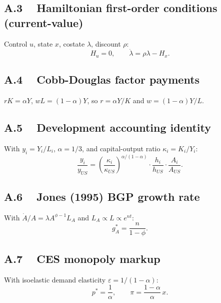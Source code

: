 \documentclass[a4paper,11pt]{article}
\begin{document}
\subsection*{A.3 ~ Hamiltonian first-order conditions (current-value)}
Control $u$, state $x$, costate $\lambda$, discount $\rho$:
\[
    H_u = 0, \qquad \dot{\lambda} = \rho\lambda - H_x.
\]

\subsection*{A.4 ~ Cobb-Douglas factor payments}
$r K = \alpha Y$, $wL = (1-\alpha)Y$, so $r = \alpha Y/K$ and $w = (1-\alpha)Y/L$.

\subsection*{A.5 ~ Development accounting identity}
With $y_i = Y_i/L_i$, $\alpha = 1/3$, and capital-output ratio $\kappa_i = K_i/Y_i$:
\[
    \frac{y_i}{y_{US}} = \left(\frac{\kappa_i}{\kappa_{US}}\right)^{\alpha/(1-\alpha)}
    \cdot \frac{h_i}{h_{US}}
    \cdot \frac{A_i}{A_{US}}.
\]

\subsection*{A.6 ~ Jones (1995) BGP growth rate}
With $\dot{A}/A = \lambda A^{\phi-1} L_A$ and $L_A \propto L \propto e^{nt}$:
\[
    g_A^* = \frac{n}{1-\phi}.
\]

\subsection*{A.7 ~ CES monopoly markup}
With isoelastic demand elasticity $\varepsilon = 1/(1-\alpha)$:
\[
    p^* = \frac{1}{\alpha}, \qquad \pi = \frac{1-\alpha}{\alpha}\,x.
\]
\end{document}
